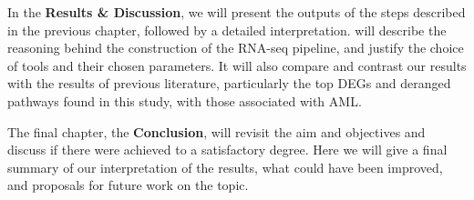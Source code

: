 In the \textbf{Results \& Discussion}, we will present the outputs of the steps described in the previous chapter, followed by a detailed interpretation. will describe the reasoning behind the construction of the RNA-seq pipeline, and justify the choice of tools and their chosen parameters. It will also compare and contrast our results with the results of previous literature, particularly the top \ac{DEG}s and deranged pathways found in this study, with those associated with \ac{AML}. 

The final chapter, the \textbf{Conclusion}, will revisit the aim and objectives and discuss if there were achieved to a satisfactory degree. Here we will give a final summary of our interpretation of the results, what could have been improved, and proposals for future work on the topic.

